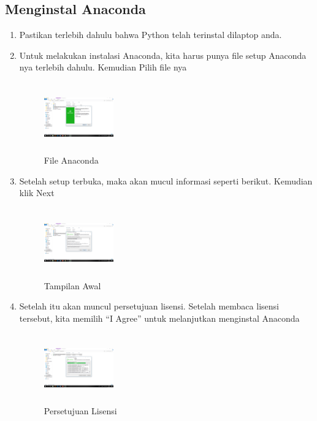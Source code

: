 \subsection{Menginstal Anaconda}
\begin{enumerate}
\item Pastikan terlebih dahulu bahwa Python telah terinstal dilaptop anda.
\item Untuk melakukan instalasi Anaconda, kita harus punya file setup Anaconda nya terlebih dahulu. Kemudian Pilih file nya
\begin{figure}[!htbp]
    \centering
    \includegraphics[width=3cm,height=3cm]{figures/1.png}
    \caption{File Anaconda}
    \label{file}
    \end{figure}

\item Setelah setup terbuka, maka akan mucul informasi seperti berikut. Kemudian klik Next
\begin{figure}[!htbp]
    \centering
    \includegraphics[width=3cm,height=3cm]{figures/2.png}
    \caption{Tampilan Awal}
    \label{awal}
    \end{figure}

\item Setelah itu akan muncul persetujuan lisensi. Setelah membaca lisensi tersebut, kita memilih “I Agree” untuk melanjutkan menginstal Anaconda
\begin{figure}[!htbp]
    \centering
    \includegraphics[width=3cm,height=3cm]{figures/3.png}
    \caption{Persetujuan Lisensi}
    \label{lisensi}
    \end{figure}


\end{enumerate}
